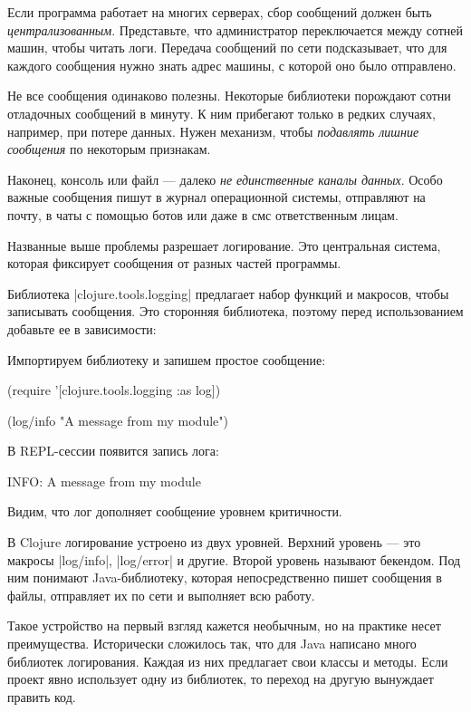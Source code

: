 Если программа работает на многих серверах, сбор сообщений должен быть
\emph{централизованным}. Представьте, что администратор переключается между сотней
машин, чтобы читать логи. Передача сообщений по сети подсказывает, что для
каждого сообщения нужно знать адрес машины, с которой оно было отправлено.

Не все сообщения одинаково полезны. Некоторые библиотеки порождают сотни
отладочных сообщений в минуту. К ним прибегают только в редких случаях,
например, при потере данных. Нужен механизм, чтобы \emph{подавлять лишние
сообщения} по некоторым признакам.

Наконец, консоль или файл — далеко \emph{не единственные каналы данных}. Особо
важные сообщения пишут в журнал операционной системы, отправляют на почту, в
чаты с помощью ботов или даже в смс ответственным лицам.

Названные выше проблемы разрешает логирование. Это центральная система, которая
фиксирует сообщения от разных частей программы.

Библиотека \spverb|clojure.tools.logging| предлагает набор функций и макросов, чтобы
записывать сообщения. Это сторонняя библиотека, поэтому перед использованием
добавьте ее в зависимости:

\begin{code}
\end{code}

Импортируем библиотеку и запишем простое сообщение:

\begin{code}
(require '[clojure.tools.logging :as log])

(log/info "A message from my module")
\end{code}

В REPL-сессии появится запись лога:

\begin{code}
INFO: A message from my module
\end{code}

Видим, что лог дополняет сообщение уровнем критичности.

В Clojure логирование устроено из двух уровней. Верхний уровень — это макросы
\spverb|log/info|, \spverb|log/error| и другие. Второй уровень называют бекендом. Под ним
понимают Java-библиотеку, которая непосредственно пишет сообщения в файлы,
отправляет их по сети и выполняет всю работу.

Такое устройство на первый взгляд кажется необычным, но на практике несет
преимущества. Исторически сложилось так, что для Java написано много библиотек
логирования. Каждая из них предлагает свои классы и методы. Если проект явно
использует одну из библиотек, то переход на другую вынуждает править код.

